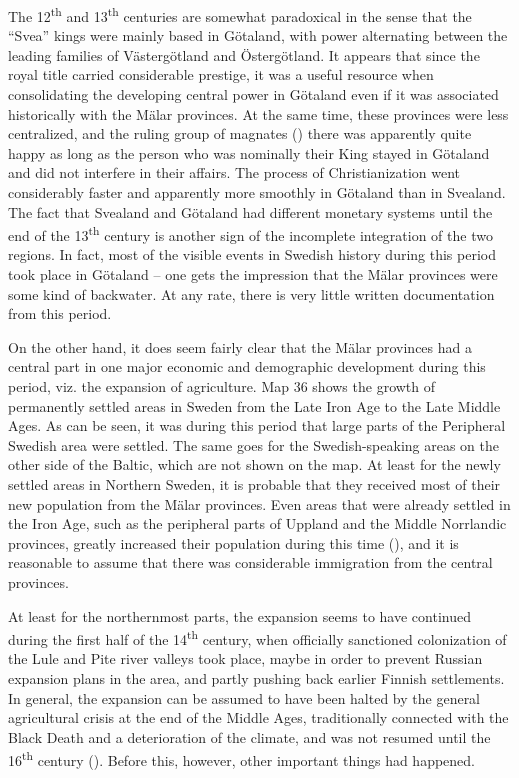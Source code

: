 The 12\textsuperscript{th} and 13\textsuperscript{th} centuries are somewhat paradoxical in the sense that the “Svea” kings were mainly based in Götaland, with power alternating between the leading families of Västergötland and Östergötland. It appears that since the royal title carried considerable prestige, it was a useful resource when consolidating the developing central power in Götaland even if it was associated historically with the Mälar provinces. At the same time, these provinces were less centralized, and the ruling group of magnates () there was apparently quite happy as long as the person who was nominally their King stayed in Götaland and did not interfere in their affairs. The process of Christianization went considerably faster and apparently more smoothly in Götaland than in Svealand. The fact that Svealand and Götaland had different monetary systems until the end of the 13\textsuperscript{th} century is another sign of the incomplete integration of the two regions. In fact, most of the visible events in Swedish history during this period took place in Götaland – one gets the impression that the Mälar provinces were some kind of backwater. At any rate, there is very little written documentation from this period. 




On the other hand, it does seem fairly clear that the Mälar provinces had a central part in one major economic and demographic development during this period, viz. the expansion of agriculture. Map 36 shows the growth of permanently settled areas in Sweden from the Late Iron Age to the Late Middle Ages. As can be seen, it was during this period that large parts of the Peripheral Swedish area were settled. The same goes for the Swedish-speaking areas on the other side of the Baltic, which are not shown on the map. At least for the newly settled areas in Northern Sweden, it is probable that they received most of their new population from the Mälar provinces. Even areas that were already settled in the Iron Age, such as the peripheral parts of Uppland and the Middle Norrlandic provinces, greatly increased their population during this time (\citet{Broberg1990}), and it is reasonable to assume that there was considerable immigration from the central provinces. 




At least for the northernmost parts, the expansion seems to have continued during the first half of the 14\textsuperscript{th} century, when officially sanctioned colonization of the Lule and Pite river valleys took place, maybe in order to prevent Russian expansion plans in the area, and partly pushing back earlier Finnish settlements. In general, the expansion can be assumed to have been halted by the general agricultural crisis at the end of the Middle Ages, traditionally connected with the Black Death and a deterioration of the climate, and was not resumed until the 16\textsuperscript{th} century (\citet[248]{Myrdal2003}). Before this, however, other important things had happened.





